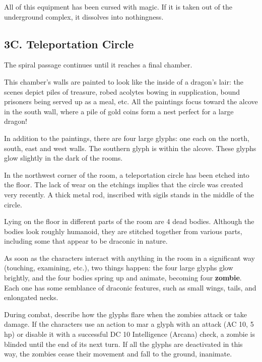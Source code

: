\documentclass[10pt,a4paper,twoside,bg=print,twocolumn,openany,nodeprecatedcode]{dndbook}
\begin{document}
All of this equipment has been cursed with magic. If it is taken out of the underground complex, it dissolves into nothingness.

\subsection{3C. Teleportation Circle}
The spiral passage continues until it reaches a final chamber.

\begin{DndReadAloud}{}
This chamber's walls are painted to look like the inside of a dragon's lair: the scenes depict piles of treasure, robed acolytes bowing in supplication, bound prisoners being served up as a meal, etc. All the paintings focus toward the alcove in the south wall, where a pile of gold coins form a nest perfect for a large dragon!

In addition to the paintings, there are four large glyphs: one each on the north, south, east and west walls. The southern glyph is within the alcove. These glyphs glow slightly in the dark of the rooms.

In the northwest corner of the room, a teleportation circle has been etched into the floor. The lack of wear on the etchings implies that the circle was created very recently. A thick metal rod, inscribed with sigils stands in the middle of the circle.

Lying on the floor in different parts of the room are 4 dead bodies. Although the bodies look roughly humanoid, they are stitched together from various parts, including some that appear to be draconic in nature.

\end{DndReadAloud}

As soon as the characters interact with anything in the room in a significant way (touching, examining, etc.), two things happen: the four large glyphs glow brightly, and the four bodies spring up and animate, becoming four \textbf{zombie}. Each one has some semblance of draconic features, such as small wings, tails, and enlongated necks.

During combat, describe how the glyphs flare when the zombies attack or take damage. If the characters use an action to mar a glyph with an attack (AC 10, 5 hp) or disable it with a successful DC 10 Intelligence (Arcana) check, a zombie is blinded until the end of its next turn. If all the glyphs are deactivated in this way, the zombies cease their movement and fall to the ground, inanimate.
\end{document}
